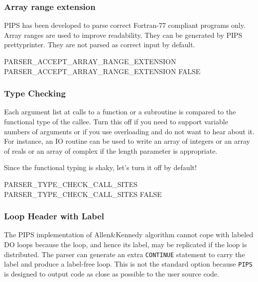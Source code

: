 \documentclass[a4paper]{report}
\newcommand{\Pips}{\texttt{PIPS}}
\begin{document}
\subsubsection*{Array range extension}

PIPS has been developed to parse correct Fortran-77 compliant programs
only. Array ranges are used to improve readability. They can be generated
by PIPS prettyprinter. They are not parsed as correct input by default.

\begin{PipsProp}{PARSER_ACCEPT_ARRAY_RANGE_EXTENSION}
PARSER_ACCEPT_ARRAY_RANGE_EXTENSION FALSE
\end{PipsProp}

\subsubsection*{Type Checking}

Each argument list at calls to a function or a subroutine is compared to
the functional type of the callee. Turn this off if you need to support
variable numbers of arguments or if you use overloading and do not want to
hear about it. For instance, an IO routine can be used to write an array
of integers or an array of reals or an array of complex if the length
parameter is appropriate.

Since the functional typing is shaky, let's turn it off by default!

\begin{PipsProp}{PARSER_TYPE_CHECK_CALL_SITES}
PARSER_TYPE_CHECK_CALL_SITES FALSE
\end{PipsProp}

\subsubsection*{Loop Header with Label}

The PIPS implementation of Allen\&Kennedy algorithm cannot cope with
labeled DO loops because the loop, and hence its label, may be
replicated if the loop is distributed. The parser can generate an extra
\verb/CONTINUE/ statement to carry the label and produce a label-free
loop. This is not the standard option because \Pips{} is designed to
output code as close as possible to the user source code.
\end{document}
